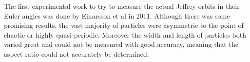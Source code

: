 The first experimental work to try to measure the actual Jeffrey orbits in their Euler angles was done by Einarsson et al \cite{JonasExperiment} in 2011. Although there was some promising results, the vast majority of particles were asymmetric to the point of chaotic or highly quasi-periodic. Moreover the width and length of particles both varied great and could not be measured with good accuracy, meaning that the aspect ratio could not accurately be determined. 